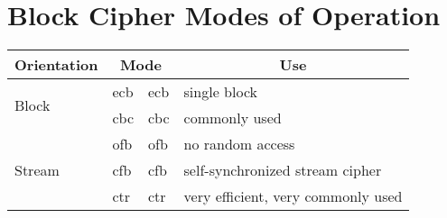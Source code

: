 \documentclass[final]{article}
\begin{document}
\section{Block Cipher Modes of Operation}
\begin{center}\begin{tabular}{llll}
        \multicolumn{1}{c}{Orientation} & \multicolumn{2}{c}{Mode} & \multicolumn{1}{c}{Use}                                      \\\toprule
        \multirow{2}{*}{Block}          & \acrshort{ecb}           & \acrlong{ecb}           & single block                       \\
                                        & \acrshort{cbc}           & \acrlong{cbc}           & commonly used                      \\\midrule
        \multirow{3}{*}{Stream}         & \acrshort{ofb}           & \acrlong{ofb}           & no random access                   \\
                                        & \acrshort{cfb}           & \acrlong{cfb}           & self-synchronized stream cipher    \\
                                        & \acrshort{ctr}           & \acrlong{ctr}           & very efficient, very commonly used \\\bottomrule
    \end{tabular}
\end{center}
\vspace*{0.25in}
\end{document}
